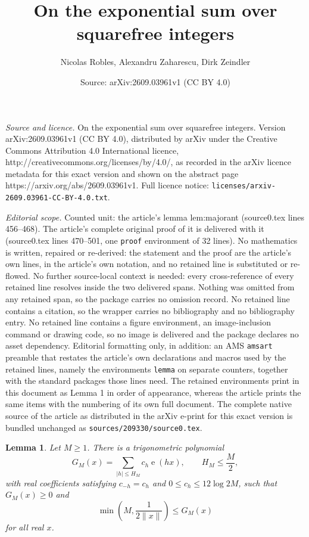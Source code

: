 \documentclass[10pt,a4paper]{amsart}
\title{On the exponential sum over squarefree integers}
\author{Nicolas Robles, Alexandru Zaharescu, Dirk Zeindler}
\date{Source: arXiv:2609.03961v1 (CC BY 4.0)}
\newtheorem{lemma}{Lemma}
\newcommand{\e}{\operatorname{e}}
\begin{document}
\maketitle

\noindent\emph{Source and licence.} On the exponential sum over squarefree integers. Version arXiv:2609.03961v1 (CC BY 4.0), distributed by arXiv under the Creative Commons Attribution 4.0 International licence, http://creativecommons.org/licenses/by/4.0/, as recorded in the arXiv licence metadata for this exact version and shown on the abstract page https://arxiv.org/abs/2609.03961v1. Full licence notice: \texttt{licenses/arxiv-2609.03961-CC-BY-4.0.txt}.\par\smallskip

\noindent\textit{Editorial scope.} Counted unit: the article's lemma lem:majorant (source0.tex lines 456--468). The article's complete original proof of it is delivered with it (source0.tex lines 470--501, one \texttt{proof} environment of 32 lines). No mathematics is written, repaired or re-derived: the statement and the proof are the article's own lines, in the article's own notation, and no retained line is substituted or re-flowed.  No further source-local context is needed: every cross-reference of every retained line resolves inside the two delivered spans.  Nothing was omitted from any retained span, so the package carries no omission record.  No retained line contains a citation, so the wrapper carries no bibliography and no bibliography entry.  No retained line contains a figure environment, an image-inclusion command or drawing code, so no image is delivered and the package declares no asset dependency.  Editorial formatting only, in addition: an AMS \texttt{amsart} preamble that restates the article's own declarations and macros used by the retained lines, namely the environments \texttt{lemma} on separate counters, together with the standard packages those lines need.  The retained environments print in this document as Lemma 1 in order of appearance, whereas the article prints the same items with the numbering of its own full document.  The complete native source of the article as distributed in the arXiv e-print for this exact version is bundled unchanged as \texttt{sources/209330/source0.tex}.
\begin{lemma}\label{lem:majorant}
Let $M\ge1$.  There is a trigonometric polynomial
\begin{equation}\label{eq:G-def}
  G_M(x)=\sum_{|h|\le H_M}c_h\e(hx),
  \qquad H_M\le\frac M2,
\end{equation}
with real coefficients satisfying $c_{-h}=c_h$ and
$0\le c_h\le12\log 2M$, such that $G_M(x)\ge0$ and
\begin{equation}\label{eq:G-majorizes}
  \min\left(M,\frac1{2\|x\|}\right)\le G_M(x)
\end{equation}
for all real $x$.
\end{lemma}
\end{document}
